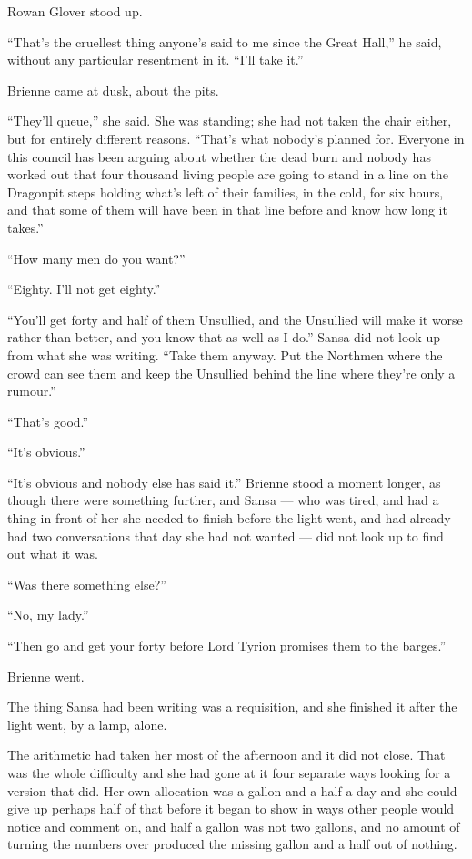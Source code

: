 Rowan Glover stood up.

“That’s the cruellest thing anyone’s said to me since the Great Hall,” he said, without any particular resentment in it. “I’ll take it.”

\sceneBreak

Brienne came at dusk, about the pits.

“They’ll queue,” she said. She was standing; she had not taken the chair either, but for entirely different reasons. “That’s what nobody’s planned for. Everyone in this council has been arguing about whether the dead burn and nobody has worked out that four thousand living people are going to stand in a line on the Dragonpit steps holding what’s left of their families, in the cold, for six hours, and that some of them will have been in that line before and know how long it takes.”

“How many men do you want?”

“Eighty. I’ll not get eighty.”

“You’ll get forty and half of them Unsullied, and the Unsullied will make it worse rather than better, and you know that as well as I do.” Sansa did not look up from what she was writing. “Take them anyway. Put the Northmen where the crowd can see them and keep the Unsullied behind the line where they’re only a rumour.”

“That’s good.”

“It’s obvious.”

“It’s obvious and nobody else has said it.” Brienne stood a moment longer, as though there were something further, and Sansa — who was tired, and had a thing in front of her she needed to finish before the light went, and had already had two conversations that day she had not wanted — did not look up to find out what it was.

“Was there something else?”

“No, my lady.”

“Then go and get your forty before Lord Tyrion promises them to the barges.”

Brienne went.

\sceneBreak

The thing Sansa had been writing was a requisition, and she finished it after the light went, by a lamp, alone.

The arithmetic had taken her most of the afternoon and it did not close. That was the whole difficulty and she had gone at it four separate ways looking for a version that did. Her own allocation was a gallon and a half a day and she could give up perhaps half of that before it began to show in ways other people would notice and comment on, and half a gallon was not two gallons, and no amount of turning the numbers over produced the missing gallon and a half out of nothing.

